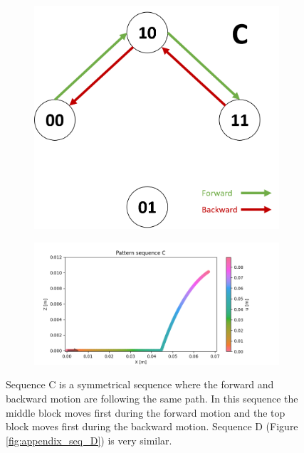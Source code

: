         
        \begin{figure}[h]
            \centering
            \begin{subfigure}{.2\textwidth}
            \includegraphics[width=\textwidth]{images/S_C.png}
            \end{subfigure}%
            \begin{subfigure}{.6\textwidth}
            \includegraphics[width=\textwidth]{images/C.png}
            \end{subfigure}
            \caption{Sequence C is a symmetrical sequence where the forward and backward motion are following the same path. In this sequence the middle block moves first during the forward motion and the top block moves first during the backward motion. Sequence D (Figure \ref{fig:appendix_seq_D}) is very similar.}
        \end{figure}
        

